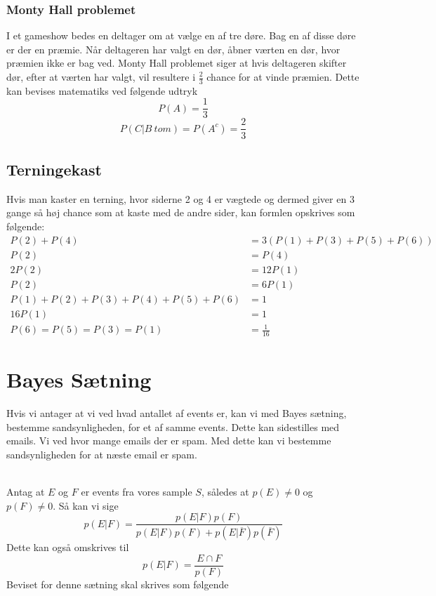 \subsubsection{Monty Hall problemet}
I et gameshow bedes en deltager om at vælge en af tre døre.
Bag en af disse døre er der en præmie.
Når deltageren har valgt en dør, åbner værten en dør, hvor præmien ikke er bag ved.
Monty Hall problemet siger at hvis deltageren skifter dør, efter at værten har valgt, vil resultere i $\frac{2}{3}$ chance for at vinde præmien.
Dette kan bevises matematiks ved følgende udtryk
\begin{equation}
P(A)=\frac{1}{3}
\end{equation}
\begin{equation}
P(C|B\ tom)=P(A^c)=\frac{2}{3}
\end{equation}

\subsection{Terningekast}
Hvis man kaster en terning, hvor siderne 2 og 4 er vægtede og dermed giver en 3 gange så høj chance som at kaste med de andre sider, kan formlen opskrives som følgende:
\begin{align*}
	P(2)+P(4)&=3(P(1)+P(3)+P(5)+P(6))\\
	P(2)&=P(4)\\
	2P(2)&=12P(1)\\
	P(2)&=6P(1)\\
	P(1)+P(2)+P(3)+P(4)+P(5)+P(6)&=1\\
	16P(1)&=1\\
	P(6)=P(5)=P(3)=P(1)&=\frac{1}{16}
\end{align*}

\section{Bayes Sætning}
Hvis vi antager at vi ved hvad antallet af events er, kan vi med Bayes sætning, bestemme sandsynligheden, for et af samme events.
Dette kan sidestilles med emails.
Vi ved hvor mange emails der er spam.
Med dette kan vi bestemme sandsynligheden for at næste email er spam.
\\\\
\begin{frtheo}
Antag at $E$ og $F$ er events fra vores sample $S$, således at $p(E)\neq0$ og $p(F)\neq0$.
Så kan vi sige
\begin{equation}
	p(E|F)=\frac{p(E|F)p(F)}{p(E|F)p(F)+p(E|\overline{F})p(\overline{F})}
\end{equation}
Dette kan også omskrives til
\begin{equation}
	p(E|F)=\frac{E\cap F}{p(F)}
\end{equation}
Beviset for denne sætning skal skrives som følgende

\end{frtheo}


